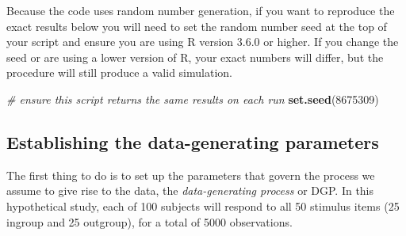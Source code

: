 \documentclass[
  english,
  doc,floatsintext]{apa6}
\newenvironment{Shaded}{\begin{snugshade}}{\end{snugshade}}
\newcommand{\CommentTok}[1]{\textcolor[rgb]{0.56,0.35,0.01}{\textit{#1}}}
\newcommand{\DecValTok}[1]{\textcolor[rgb]{0.00,0.00,0.81}{#1}}
\newcommand{\KeywordTok}[1]{\textcolor[rgb]{0.13,0.29,0.53}{\textbf{#1}}}
\newcommand{\NormalTok}[1]{#1}
\begin{document}
Because the code uses random number generation, if you want to reproduce the exact results below you will need to set the random number seed at the top of your script and ensure you are using R version 3.6.0 or higher. If you change the seed or are using a lower version of R, your exact numbers will differ, but the procedure will still produce a valid simulation.

\begin{Shaded}
\begin{Highlighting}[]
\CommentTok{# ensure this script returns the same results on each run}
\KeywordTok{set.seed}\NormalTok{(}\DecValTok{8675309}\NormalTok{)}
\end{Highlighting}
\end{Shaded}

\hypertarget{establishing-the-data-generating-parameters}{%
\subsection{Establishing the data-generating parameters}\label{establishing-the-data-generating-parameters}}

The first thing to do is to set up the parameters that govern the process we assume to give rise to the data, the \emph{data-generating process} or DGP. In this hypothetical study, each of 100 subjects will respond to all 50 stimulus items (25 ingroup and 25 outgroup), for a total of 5000 observations.
\end{document}
